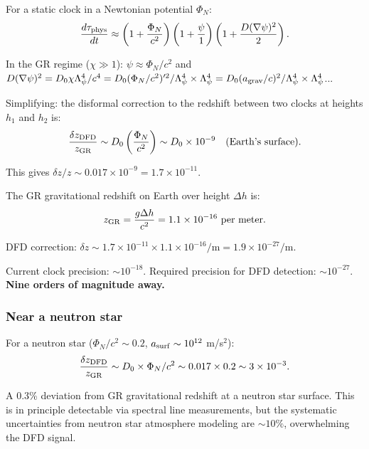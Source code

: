 \documentclass[11pt,a4paper]{article}
\begin{document}
For a static clock in a Newtonian potential $\Phi_N$:
\begin{equation}
\frac{d\tau_{\rm phys}}{dt} \approx \left(1 + \frac{\Phi_N}{c^2}\right)\left(1 + \frac{\psi}{1}\right)\left(1 + \frac{D(\nabla\psi)^2}{2}\right).
\end{equation}

In the GR regime ($\chi \gg 1$): $\psi \approx \Phi_N/c^2$ and $D(\nabla\psi)^2 = D_0\chi\Lambda_\psi^4/c^4 = D_0(\Phi_N/c^2)'^2/\Lambda_\psi^4 \times \Lambda_\psi^4 = D_0(a_{\rm grav}/c)^2/\Lambda_\psi^4 \times \Lambda_\psi^4$...

Simplifying: the disformal correction to the redshift between two clocks at heights $h_1$ and $h_2$ is:
\begin{equation}
\frac{\delta z_{\rm DFD}}{z_{\rm GR}} \sim D_0\left(\frac{\Phi_N}{c^2}\right) \sim D_0 \times 10^{-9} \quad \text{(Earth's surface)}.
\end{equation}

This gives $\delta z/z \sim 0.017 \times 10^{-9} = 1.7 \times 10^{-11}$.

The GR gravitational redshift on Earth over height $\Delta h$ is:
\begin{equation}
z_{\rm GR} = \frac{g\Delta h}{c^2} = 1.1 \times 10^{-16}\text{ per meter}.
\end{equation}

DFD correction: $\delta z \sim 1.7 \times 10^{-11} \times 1.1 \times 10^{-16}/\text{m} = 1.9 \times 10^{-27}/\text{m}$.

Current clock precision: $\sim 10^{-18}$. Required precision for DFD detection: $\sim 10^{-27}$. \textbf{Nine orders of magnitude away.}

\subsubsection{Near a neutron star}

For a neutron star ($\Phi_N/c^2 \sim 0.2$, $a_{\rm surf} \sim 10^{12}$ m/s$^2$):
\begin{equation}
\frac{\delta z_{\rm DFD}}{z_{\rm GR}} \sim D_0 \times \Phi_N/c^2 \sim 0.017 \times 0.2 \sim 3 \times 10^{-3}.
\end{equation}

A 0.3\% deviation from GR gravitational redshift at a neutron star surface. This is in principle detectable via spectral line measurements, but the systematic uncertainties from neutron star atmosphere modeling are $\sim 10\%$, overwhelming the DFD signal.
\end{document}
